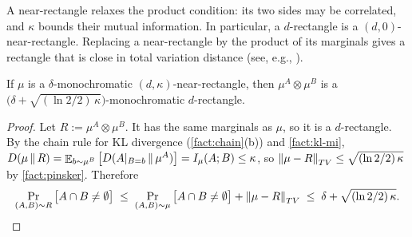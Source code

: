 \noindent A near-rectangle relaxes the product condition: its two sides may be correlated, and $\kappa$ bounds their mutual information. In particular, a $d$-rectangle is a $(d, 0)$-near-rectangle. Replacing a near-rectangle by the product of its marginals gives a rectangle that is close in total variation distance (see, e.g., \cite{ko_omega_2026}).

\begin{lemma}\label{lem:rect}
If $\mu$ is a $\delta$-monochromatic $(d,\kappa)$-near-rectangle, then $\mu^A \otimes \mu^B$ is a $\big(\delta + \sqrt{(\ln 2/2)\,\kappa}\big)$-monochromatic $d$-rectangle.
\end{lemma}
\begin{proof}
Let $R := \mu^A \otimes \mu^B$. It has the same marginals as $\mu$, so it is a $d$-rectangle. By the chain rule for KL divergence (\cref{fact:chain}(b)) and \cref{fact:kl-mi}, $D(\mu \,\|\, R) = \mathop{\mathbb{E}}_{b \sim \mu^B}\big[D(A|_{B = b} \,\|\, \mu^A)\big] = I_\mu(A; B) \le \kappa$, so $\left\lVert \mu - R\right\rVert_{TV} \le \sqrt{(\ln 2/2)\,\kappa}$ by \cref{fact:pinsker}. Therefore
\[ \Pr_{(A, B) \sim R}\big[A \cap B \ne \emptyset\big] \;\le\; \Pr_{(A, B) \sim \mu}\big[A \cap B \ne \emptyset\big] + \left\lVert \mu - R\right\rVert_{TV} \;\le\; \delta + \sqrt{(\ln 2/2)\,\kappa}. \qedhere \]
\end{proof}